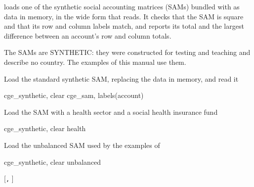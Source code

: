 

 loads one of the synthetic social accounting matrices
(SAMs) bundled with \pkg as data in memory, in the wide form that
 reads. It checks that the SAM is square and that its row and
column labels match, and reports its total and the largest difference between
an account's row and column totals.

The SAMs are SYNTHETIC: they were constructed for testing and teaching and
describe no country. The examples of this manual use them.


Load the standard synthetic SAM, replacing the data in memory, and read it
\begin{stcode}
cge_synthetic, clear
cge_sam, labels(account)
\end{stcode}
Load the SAM with a health sector and a social health insurance fund
\begin{stcode}
cge_synthetic, clear health
\end{stcode}
Load the unbalanced SAM used by the examples of 
\begin{stcode}
cge_synthetic, clear unbalanced
\end{stcode}


\begin{stsyntax}
 [\texttt{,}  ]
\end{stsyntax}

